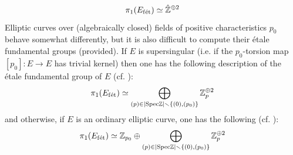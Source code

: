\begin{example}
\begin{itemize}
                        $$\pi_1(E_{\mathrm{f\acute{e}t}}) \simeq \hat{\mathbb{Z}}^{\oplus 2}$$
                    Elliptic curves over (algebraically closed) fields of positive characteristics $p_0$ behave somewhat differently, but it is also difficult to compute their \'etale fundamental groups (provided). If $E$ is supersingular (i.e. if the $p_0$-torsion map $[p_0]: E \to E$ has trivial kernel) then one has the following description of the \'etale fundamental group of $E$ (cf. \cite[Proposition 5.13]{kundu_etale_fundamental_group_of_elliptic_curves}):
                        $$\pi_1(E_{\mathrm{f\acute{e}t}}) \simeq \bigoplus_{(p) \in |\mathrm{Spec} \mathbb{Z}| \smallsetminus \{(0), (p_0)\}} \mathbb{Z}_p^{\oplus 2}$$
                    and otherwise, if $E$ is an ordinary elliptic curve, one has the following (cf. \cite[Proposition 5.14]{kundu_etale_fundamental_group_of_elliptic_curves}):
                        $$\pi_1(E_{\mathrm{f\acute{e}t}}) \simeq \mathbb{Z}_{p_0} \oplus \bigoplus_{(p) \in |\mathrm{Spec} \mathbb{Z}| \smallsetminus \{(0), (p_0)\}} \mathbb{Z}_p^{\oplus 2}$$
                \end{itemize}
            \end{example}
        

